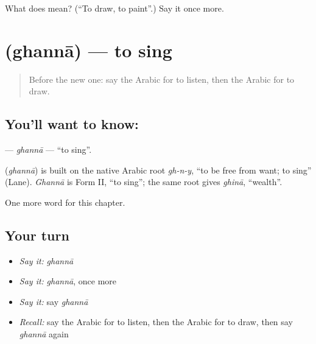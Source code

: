 \begin{tcolorbox}[breakable,colback=teal!4,colframe=teal!35!black,title={Before you move on}]
What does  mean? (\textquotedblleft{}To draw, to paint\textquotedblright{}.) Say it once more.
\end{tcolorbox}
\section[\texorpdfstring{\ar{غنى} (ghannā)}{غنى (ghannā)}]{ (ghannā) — to sing}

\label{lesson:AR-C228-ghanna}



\begin{quote}
Before the new one: say the Arabic for to listen, then the Arabic for to draw.
\end{quote}

\subsection*{You'll want to know: }
\textbf{} — \emph{ghannā} — \textquotedblleft{}to sing\textquotedblright{}.

\begin{cousinweb}
\textbf{} (\emph{ghannā}) is built on the native Arabic root \emph{gh-n-y}, \textquotedblleft{}to be free from want; to sing\textquotedblright{} (Lane). \emph{Ghannā} is Form II, \textquotedblleft{}to sing\textquotedblright{}; the same root gives \emph{ghinā}, \textquotedblleft{}wealth\textquotedblright{}.
\end{cousinweb}

\begin{grammarlens}[title={What you've built}]
One more word for this chapter.
\end{grammarlens}

\subsection*{Your turn}
\begin{itemize}
\raggedright
  \item \emph{Say it:} \emph{ghannā}
  \item \emph{Say it:} \emph{ghannā}, once more
  \item \emph{Say it:} say \emph{ghannā}
  \item \emph{Recall:} say the Arabic for to listen, then the Arabic for to draw, then say \emph{ghannā} again
\end{itemize}


